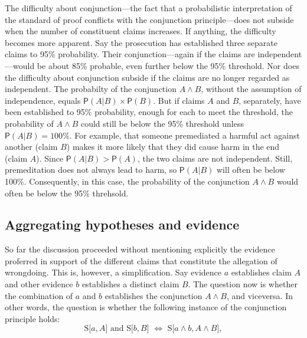 \documentclass[10pt,dvipsnames,enabledeprecatedfontcommands]{scrartcl}
\newcommand{\et}{\wedge}
\newcommand{\pr}[1]{\mathsf{P}(#1)}
\begin{document}
The difficulty about conjunction---the fact that a probabilistic
interpretation of the standard of proof conflicts with the conjunction
principle---does not subside when the number of constituent claims
increases. If anything, the difficulty becomes more apparent. Say the
prosecution has established three separate claims to 95\% probability.
Their conjunction---again if the claims are independent---would be about
85\% probable, even further below the 95\% threshold. Nor does the
difficulty about conjunction subside if the claims are no longer
regarded as independent. The probabilty of the conjunction \(A \et B\),
without the assumption of independence, equals
\(\pr{A | B} \times \pr{B}\). But if claims \(A\) and \(B\), separately,
have been established to 95\% probability, enough for each to meet the
threshold, the probability of \(A \et B\) could still be below the 95\%
threshold unless \(\pr{A | B}=100\%\). For example, that someone
premediated a harmful act against another (claim \(B\)) makes it more
likely that they did cause harm in the end (claim \(A\)). Since
\(\pr{A | B} > \pr{A}\), the two claims are not independent. Still,
premeditation does not always lead to harm, so \(\pr{A | B}\) will often
be below 100\%. Consequently, in this case, the probability of the
conjunction \(A \et B\) would often be below the 95\%
threhsold.

\hypertarget{aggregating-hypotheses-and-evidence}{%
\subsection{Aggregating hypotheses and
evidence}\label{aggregating-hypotheses-and-evidence}}

So far the discussion proceeded without mentioning explicitly the
evidence proferred in support of the different claims that constitute
the allegation of wrongdoing. This is, however, a simplification. Say
evidence \(a\) establishes claim \(A\) and other evidence \(b\)
establishes a distinct claim \(B\). The question now is whether the
combination of \(a\) and \(b\) establishes the conjunction \(A \et B\),
and viceversa. In other words, the question is whether the following
instance of the conjunction principle holds:
\[\text{S[$a, A$] and S[$b, B$] $\Leftrightarrow$ S[$a \wedge b, A\wedge B$]},\]
\end{document}
